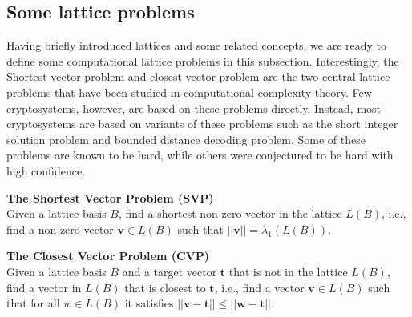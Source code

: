 \documentclass[../main.tex]{subfiles}
\begin{document}

\subsection{Some lattice problems}
\label{subsec:lattice problem}
Having briefly introduced lattices and some related concepts, we are ready to define some computational lattice problems in this subsection. Interestingly, the Shortest vector problem and closest vector problem are the two central lattice problems that have been studied in computational complexity theory. Few cryptosystems, however, are based on these problems directly. Instead, most cryptosystems are based on variants of these problems such as the short integer solution problem and bounded distance decoding problem. Some of these problems are known to be hard, while others were conjectured to be hard with high confidence. 



\begin{tcolorbox}
\noindent
\textbf{The Shortest Vector Problem (SVP) }\\
Given a lattice basis $B$, find a shortest non-zero vector in the lattice $L(B)$, i.e., find a non-zero vector $\mathbf{v} \in L(B)$ such that $||\mathbf{v}|| = \lambda_1(L(B))$. 
\end{tcolorbox}

\begin{tcolorbox}
\noindent
\textbf{The Closest Vector Problem (CVP) }\\
Given a lattice basis $B$ and a target vector $\mathbf{t}$ that is not in the lattice $L(B)$, find a vector in $L(B)$ that is closest to $\mathbf{t}$, i.e., find a vector $\mathbf{v} \in L(B)$ such that for all $w \in L(B)$ it satisfies $||\mathbf{v} - \mathbf{t}|| \le ||\mathbf{w} - \mathbf{t}||$. 
\end{tcolorbox}
\end{document}
